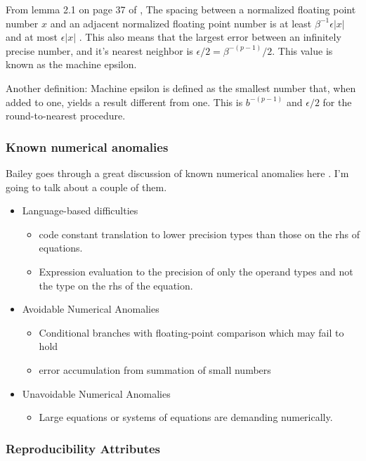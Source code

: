 \documentclass{article}
\begin{document}
From lemma 2.1 on page 37 of \cite{higham-numerical-accuracy-and-stability}, The spacing between a normalized floating point number $x$ and an adjacent normalized floating point number is at least $\beta^{-1}\epsilon|x|$ and at most $\epsilon|x|$ \cite{higham-numerical-accuracy-and-stability}. This also means that the largest error between an infinitely precise number, and it's nearest neighbor is $\epsilon/2 = \beta^{-(p-1)}/2$. This value is known as the machine epsilon.

Another definition: Machine epsilon is defined as the smallest number that, when added to one, yields a result different from one. This is $b^{-(p-1)}$ and $\epsilon/2$ for the round-to-nearest procedure.

\subsubsection{Known numerical anomalies}

Bailey goes through a great discussion of known numerical anomalies here \cite{dhb-numerical-bugs}. I'm going to talk about a couple of them.

\begin{itemize}
\item Language-based difficulties
\begin{itemize}
\item code constant translation to lower precision types than those on the rhs of equations.
\item Expression evaluation to the precision of only the operand types and not the type on the rhs of the equation.
\end{itemize}
\item Avoidable Numerical Anomalies
\begin{itemize}
\item Conditional branches with floating-point comparison which may fail to hold
\item error accumulation from summation of small numbers
\end{itemize}
\item Unavoidable Numerical Anomalies
\begin{itemize}
\item Large equations or systems of equations are demanding numerically.
\end{itemize}
\end{itemize}

\subsubsection{Reproducibility Attributes}
\end{document}
